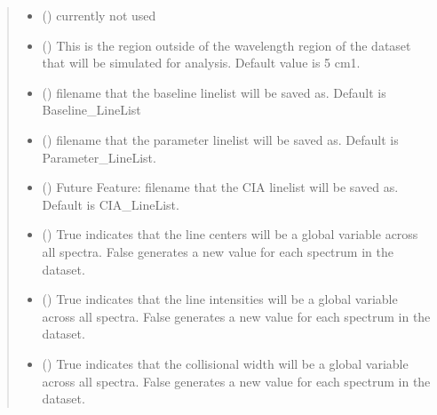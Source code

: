 \documentclass[letterpaper,10pt,english]{sphinxmanual}
\begin{document}
\begin{fulllineitems}
\begin{quote}
\begin{description}
\begin{itemize}
\item {} 
\sphinxAtStartPar
{} () \textendash{} currently not used

\item {} 
\sphinxAtStartPar
{} () \textendash{} This is the region outside of the wavelength region of the dataset that will be simulated for analysis. Default value is 5 cm\sphinxhyphen{}1.

\item {} 
\sphinxAtStartPar
{} () \textendash{} filename that the baseline linelist will be saved as. Default is Baseline\_LineList

\item {} 
\sphinxAtStartPar
{} () \textendash{} filename that the parameter linelist will be saved as. Default is Parameter\_LineList.

\item {} 
\sphinxAtStartPar
{} () \textendash{} Future Feature: filename that the CIA linelist will be saved as. Default is CIA\_LineList.

\item {} 
\sphinxAtStartPar
{} () \textendash{} True indicates that the line centers will be a global variable across all spectra. False generates a new value for each spectrum in the dataset.

\item {} 
\sphinxAtStartPar
{} () \textendash{} True indicates that the line intensities will be a global variable across all spectra. False generates a new value for each spectrum in the dataset.

\item {} 
\sphinxAtStartPar
{} () \textendash{} True indicates that the collisional width will be a global variable across all spectra. False generates a new value for each spectrum in the dataset.


\end{itemize}
\end{description}
\end{quote}
\end{fulllineitems}
\end{document}
